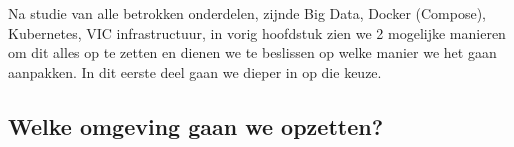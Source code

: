 
\chapter{}%
\label{ch:methodologie}


\lstset{
    language=yaml
    basicstyle=\ttfamily,
    columns=fullflexible,
    frame=single,
    breaklines=true
}

Na studie van alle betrokken onderdelen, zijnde Big Data, Docker (Compose), Kubernetes, VIC infrastructuur, in vorig hoofdstuk zien we 2 mogelijke manieren om dit alles op te zetten en dienen we te beslissen op welke manier we het gaan aanpakken. In dit eerste deel gaan we dieper in op die keuze.

\section{Welke omgeving gaan we opzetten?}

